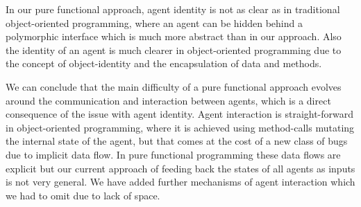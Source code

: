 In our pure functional approach, agent identity is not as clear as in traditional object-oriented programming, where an agent can be hidden behind a polymorphic interface which is much more abstract than in our approach. Also the identity of an agent is much clearer in object-oriented programming due to the concept of object-identity and the encapsulation of data and methods.

We can conclude that the main difficulty of a pure functional approach evolves around the communication and interaction between agents, which is a direct consequence of the issue with agent identity. Agent interaction is straight-forward in object-oriented programming, where it is achieved using method-calls mutating the internal state of the agent, but that comes at the cost of a new class of bugs due to implicit data flow. In pure functional programming these data flows are explicit but our current approach of feeding back the states of all agents as inputs is not very general. We have added further mechanisms of agent interaction which we had to omit due to lack of space.
